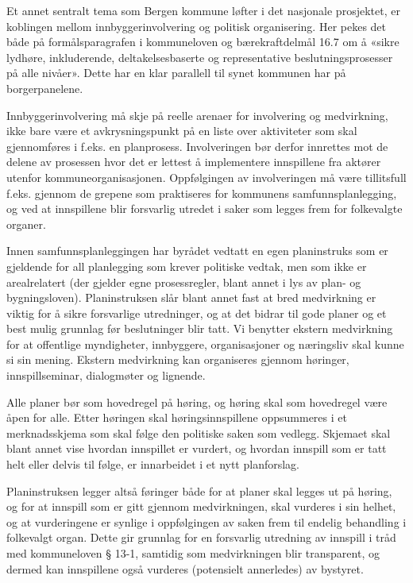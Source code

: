 \documentclass[
  12pt,
  a4paper, 12pt]{article}
\begin{document}
Et annet sentralt tema som Bergen kommune løfter i det nasjonale prosjektet, er koblingen mellom innbyggerinvolvering og politisk organisering. Her pekes det både på formålsparagrafen i kommuneloven og bærekraftdelmål 16.7 om å «sikre lydhøre, inkluderende, deltakelsesbaserte og representative beslutningsprosesser på alle nivåer». Dette har en klar parallell til synet kommunen har på borgerpanelene.

Innbyggerinvolvering må skje på reelle arenaer for involvering og medvirkning, ikke bare være et avkrysningspunkt på en liste over aktiviteter som skal gjennomføres i f.eks. en planprosess. Involveringen bør derfor innrettes mot de delene av prosessen hvor det er lettest å implementere innspillene fra aktører utenfor kommuneorganisasjonen. Oppfølgingen av involveringen må være tillitsfull f.eks. gjennom de grepene som praktiseres for kommunens samfunnsplanlegging, og ved at innspillene blir forsvarlig utredet i saker som legges frem for folkevalgte organer.

Innen samfunnsplanleggingen har byrådet vedtatt en egen planinstruks som er gjeldende for all planlegging som krever politiske vedtak, men som ikke er arealrelatert (der gjelder egne prosessregler, blant annet i lys av plan- og bygningsloven). Planinstruksen slår blant annet fast at bred medvirkning er viktig for å sikre forsvarlige utredninger, og at det bidrar til gode planer og et best mulig grunnlag før beslutninger blir tatt. Vi benytter ekstern medvirkning for at offentlige myndigheter, innbyggere, organisasjoner og næringsliv skal kunne si sin mening. Ekstern medvirkning kan organiseres gjennom høringer, innspillseminar, dialogmøter og lignende.

Alle planer bør som hovedregel på høring, og høring skal som hovedregel være åpen for alle. Etter høringen skal høringsinnspillene oppsummeres i et merknadsskjema som skal følge den politiske saken som vedlegg. Skjemaet skal blant annet vise hvordan innspillet er vurdert, og hvordan innspill som er tatt helt eller delvis til følge, er innarbeidet i et nytt planforslag.

Planinstruksen legger altså føringer både for at planer skal legges ut på høring, og for at innspill som er gitt gjennom medvirkningen, skal vurderes i sin helhet, og at vurderingene er synlige i oppfølgingen av saken frem til endelig behandling i folkevalgt organ. Dette gir grunnlag for en forsvarlig utredning av innspill i tråd med kommuneloven § 13-1, samtidig som medvirkningen blir transparent, og dermed kan innspillene også vurderes (potensielt annerledes) av bystyret.
\end{document}
